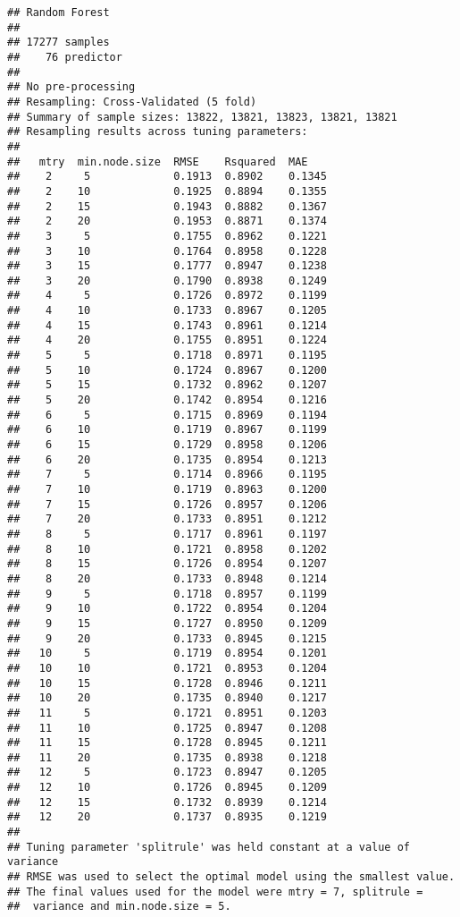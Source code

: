\documentclass[]{article}
\begin{document}
\begin{verbatim}
## Random Forest 
## 
## 17277 samples
##    76 predictor
## 
## No pre-processing
## Resampling: Cross-Validated (5 fold) 
## Summary of sample sizes: 13822, 13821, 13823, 13821, 13821 
## Resampling results across tuning parameters:
## 
##   mtry  min.node.size  RMSE    Rsquared  MAE   
##    2     5             0.1913  0.8902    0.1345
##    2    10             0.1925  0.8894    0.1355
##    2    15             0.1943  0.8882    0.1367
##    2    20             0.1953  0.8871    0.1374
##    3     5             0.1755  0.8962    0.1221
##    3    10             0.1764  0.8958    0.1228
##    3    15             0.1777  0.8947    0.1238
##    3    20             0.1790  0.8938    0.1249
##    4     5             0.1726  0.8972    0.1199
##    4    10             0.1733  0.8967    0.1205
##    4    15             0.1743  0.8961    0.1214
##    4    20             0.1755  0.8951    0.1224
##    5     5             0.1718  0.8971    0.1195
##    5    10             0.1724  0.8967    0.1200
##    5    15             0.1732  0.8962    0.1207
##    5    20             0.1742  0.8954    0.1216
##    6     5             0.1715  0.8969    0.1194
##    6    10             0.1719  0.8967    0.1199
##    6    15             0.1729  0.8958    0.1206
##    6    20             0.1735  0.8954    0.1213
##    7     5             0.1714  0.8966    0.1195
##    7    10             0.1719  0.8963    0.1200
##    7    15             0.1726  0.8957    0.1206
##    7    20             0.1733  0.8951    0.1212
##    8     5             0.1717  0.8961    0.1197
##    8    10             0.1721  0.8958    0.1202
##    8    15             0.1726  0.8954    0.1207
##    8    20             0.1733  0.8948    0.1214
##    9     5             0.1718  0.8957    0.1199
##    9    10             0.1722  0.8954    0.1204
##    9    15             0.1727  0.8950    0.1209
##    9    20             0.1733  0.8945    0.1215
##   10     5             0.1719  0.8954    0.1201
##   10    10             0.1721  0.8953    0.1204
##   10    15             0.1728  0.8946    0.1211
##   10    20             0.1735  0.8940    0.1217
##   11     5             0.1721  0.8951    0.1203
##   11    10             0.1725  0.8947    0.1208
##   11    15             0.1728  0.8945    0.1211
##   11    20             0.1735  0.8938    0.1218
##   12     5             0.1723  0.8947    0.1205
##   12    10             0.1726  0.8945    0.1209
##   12    15             0.1732  0.8939    0.1214
##   12    20             0.1737  0.8935    0.1219
## 
## Tuning parameter 'splitrule' was held constant at a value of variance
## RMSE was used to select the optimal model using the smallest value.
## The final values used for the model were mtry = 7, splitrule =
##  variance and min.node.size = 5.
\end{verbatim}
\end{document}

